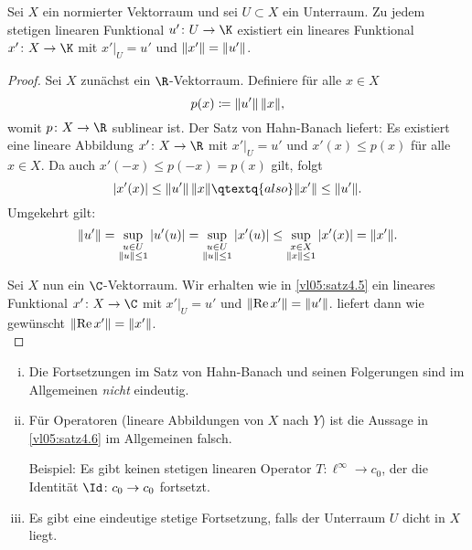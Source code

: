 \begin{thSatz} \label{vl05:satz4.6}
    Sei $X$ ein normierter Vektorraum und sei $U\subset X$ ein Unterraum. Zu
    jedem stetigen linearen Funktional $u'\colon U\to\K$ existiert ein lineares
    Funktional $x'\colon X\to\K$ mit $x'\vert_U = u'$ und $\lVert x'\rVert=\lVert u'\rVert$.
\end{thSatz}

\begin{proof}
    Sei $X$ zunächst ein $\R$-Vektorraum. Definiere für alle $x\in X$
    \[ p(x) \defeq \norm*{u'} \, \norm{x}  , \]
    womit $p\colon X\to\R$ sublinear ist. Der Satz von Hahn-Banach
     liefert: Es existiert eine lineare Abbildung
    $x'\colon X\to\R$ mit $x'\vert_U = u'$ und $x'(x) \leq p(x)$ für alle
    $x\in X$. Da auch $x'(-x) \leq p(-x) = p(x)$ gilt, folgt
    \[ \abs*{x'(x)}\leq \norm*{u'} \, \norm{x}  \qtextq{also}
        \norm*{x'}\leq\norm*{u'}
    . \]
    Umgekehrt gilt:
    \[ \norm*{u'} = \sup_{\substack{u\in U\\\norm{u}\leq1}} \, \abs*{u'(u)}
        = \sup_{\substack{u\in U\\\norm{u}\leq1}}           \, \abs*{x'(u)}
        \leq \sup_{\substack{x\in X\\\norm{x}\leq1}}        \, \abs*{x'(x)}
        = \norm*{x'}
    . \]
    
    Sei $X$ nun ein $\C$-Vektorraum. Wir erhalten wie in \cref{vl05:satz4.5}
    ein lineares Funktional $x'\colon X\to\C$ mit $x'\vert_U = u'$ und 
    $\norm*{\Re x'} = \norm*{u'}$.  liefert dann
    wie gewünscht $\norm*{\Re x'} = \norm*{x'}$.
    \\
\end{proof}

\begin{thBemerkung}\hfill
    \begin{enumerate}[i)]
        \item
            Die Fortsetzungen im Satz von Hahn-Banach 
            und seinen Folgerungen sind im Allgemeinen \emph{nicht} eindeutig.
        \item
            Für Operatoren (lineare Abbildungen von $X$ nach $Y$) ist die
            Aussage in \cref{vl05:satz4.6} im Allgemeinen falsch.
            
            Beispiel: Es gibt keinen stetigen linearen Operator
            $T\colon\ell^\infty\to c_0$, der die Identität $\Id\colon c_0\to
            c_0$ fortsetzt.
        \item
            Es gibt eine eindeutige stetige Fortsetzung, falls der Unterraum
            $U$ dicht in $X$ liegt.
    \end{enumerate}
\end{thBemerkung}

